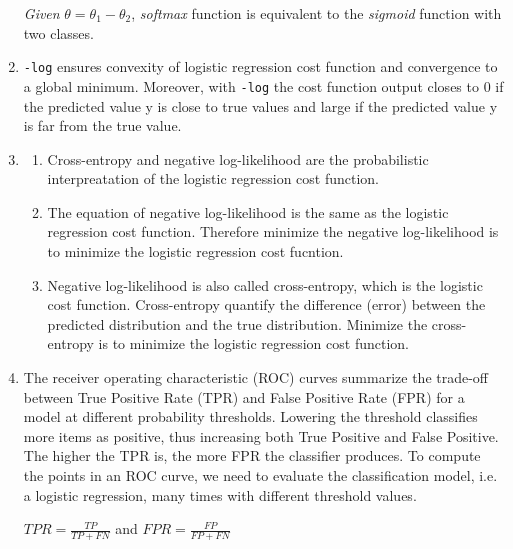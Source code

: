 \documentclass[12pt]{article}
\begin{document}
\begin{enumerate}
\textit{Given}  $\theta = \theta_1 - \theta_2$, \textit{softmax} function is equivalent to the \textit{sigmoid} function with two classes.

\item  \texttt{-log} ensures convexity of logistic regression cost function and convergence to a global minimum. Moreover, with \texttt{-log}  the cost function output closes to 0 if the predicted value y is close to true values and large if the predicted value y is far from the true value.

\item 
\begin{enumerate}
	\item Cross-entropy and negative log-likelihood are the probabilistic interpreatation of the logistic regression cost function.
	\item The equation of negative log-likelihood is the same as the logistic regression cost function. Therefore minimize the negative log-likelihood is to minimize the logistic regression cost fucntion.
	\item Negative log-likelihood is also called cross-entropy, which is the logistic cost function. Cross-entropy quantify the difference (error) between the predicted distribution and the true distribution. Minimize the cross-entropy is to minimize the logistic regression cost function.
\end{enumerate}

\item The receiver operating characteristic (ROC) curves summarize the trade-off between True Positive Rate (TPR) and False Positive Rate (FPR) for a model at different probability thresholds. Lowering the threshold classifies more items as positive, thus increasing both True Positive and False Positive. The higher the TPR is, the more FPR the classifier produces. To compute the points in an ROC curve, we need to evaluate the classification model, i.e. a logistic regression, many times with different threshold values.

$ TPR=\frac{TP}{TP + FN} $ and $ FPR=\frac{FP}{FP + FN} $


\end{enumerate}
\end{document}

